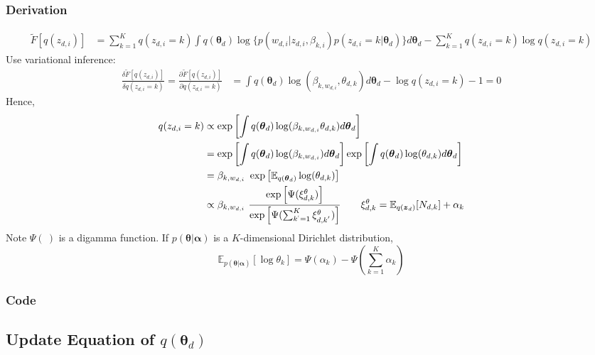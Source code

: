 \documentclass[a4paper,10.5pt,dvipdfmx]{jarticle}  %
\begin{document}
\subsubsection{Derivation}
\begin{align}
	\widetilde{F}[q(z_{d,i})] &= \sum_{k=1}^{K} q(z_{d,i} = k) \int q(\boldsymbol{\theta}_d) \log \{ p(w_{d,i} | z_{d,i}, \beta_{k,i}) p(z_{d,i} = k | \boldsymbol{\theta}_d) \} d \boldsymbol{\theta}_d - \sum_{k=1}^{K} q(z_{d,i}=k) \log q(z_{d,i}=k)
\end{align}
Use variational inference:
\begin{align}
	\frac{\delta \widetilde{F}[q(z_{d,i})]}{\delta q(z_{d,i} = k)} = \frac{\partial \widetilde{F}[q(z_{d,i})]}{\partial q(z_{d,i} = k)} &= \int q(\boldsymbol{\theta}_d) \log(\beta_{k, w_{d,i}}, \theta_{d,k}) d \boldsymbol{\theta}_d - \log q(z_{d,i} = k) - 1 = 0
\end{align}
Hence,
\begin{align}
	q(z_{d,i} = k) &\propto \exp \left[ \int q(\boldsymbol{\theta}_d) \log (\beta_{k, w_{d,i}} \theta_{d,k}) d \boldsymbol{\theta}_d \right] \\
&= \exp \left[ \int q (\boldsymbol{\theta}_d) \log(\beta_{k, w_{d,i}}) d \boldsymbol{\theta}_d \right] \exp \left[\int q(\boldsymbol{\theta}_d) \log(\theta_{d,k}) d \boldsymbol{\theta}_d  \right]\\
&= \beta_{k, w_{d,i}} \ \exp \left[ \mathbb{E}_{q(\boldsymbol{\theta}_d)} \log(\theta_{d,k}) \right]\\
&\propto \beta_{k, w_{d,i}} \ \frac{\exp \left[ \Psi( \xi_{d,k}^{\theta}) \right]}{\exp \left[ \Psi( \sum_{k^{`} = 1}^{K} \xi_{d,k^{'}}^{\theta}) \right]} \qquad \xi_{d,k}^{\theta} = \mathbb{E}_{q(\boldsymbol{z}_d)} [N_{d,k}] + \alpha_k
\end{align}
Note $\Psi(\ )$ is a digamma function. If $p(\boldsymbol{\theta} | \boldsymbol{\alpha})$ is a $K$-dimensional Dirichlet distribution,$$ \mathbb{E}_{p(\boldsymbol{\theta} | \boldsymbol{\alpha})} [\log \theta_k] = \Psi(\alpha_k) - \Psi \left( \sum_{k=1}^{K} \alpha_k \right) $$

\subsubsection{Code}

\subsection{Update Equation of $q(\boldsymbol{\theta}_d)$}
\end{document}
